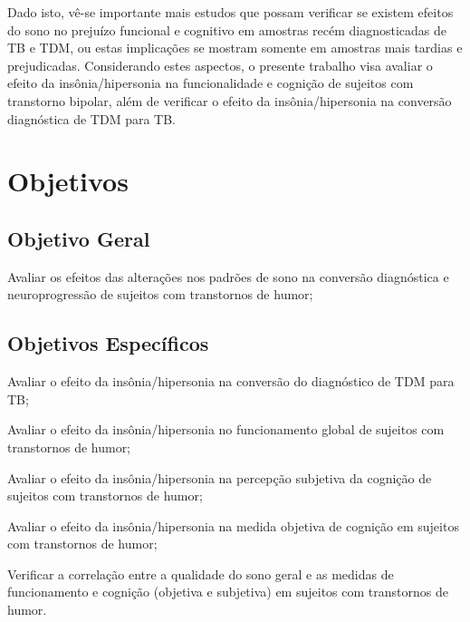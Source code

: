 \documentclass[chapter=TITLE,
               oneside,
               12pt,
               a4paper,
               english,
               brazil]{abntex2}    %
\begin{document}
    Dado isto, vê-se importante mais estudos que possam verificar se existem efeitos
    do sono no prejuízo funcional e cognitivo em amostras recém diagnosticadas
    de TB e TDM, ou estas implicações se mostram somente em amostras mais
    tardias e prejudicadas.
    Considerando estes aspectos, o presente trabalho visa avaliar o efeito da
    insônia/hipersonia na funcionalidade e cognição de sujeitos com transtorno
    bipolar, além de verificar o efeito da insônia/hipersonia na conversão
    diagnóstica de TDM para TB.

\vspace{\onelineskip}
\chapter{Objetivos}\label{sec:objetivos}

    \section{Objetivo Geral}\label{sec:geral}
    
        \begin{alineas}
    
            \item Avaliar os efeitos das alterações nos padrões de sono na
            conversão diagnóstica e neuroprogressão de sujeitos com transtornos
            de humor;

        \end{alineas}
    
    \section{Objetivos Específicos}\label{sec:especifico}
    
        \begin{alineas}[resume]
    
            \item Avaliar o efeito da insônia/hipersonia na conversão do
            diagnóstico de TDM para TB;

            \item Avaliar o efeito da insônia/hipersonia no funcionamento global
            de sujeitos com transtornos de humor;
    
            \item Avaliar o efeito da insônia/hipersonia na percepção subjetiva
            da cognição de sujeitos com transtornos de humor;

            \item Avaliar o efeito da insônia/hipersonia na medida objetiva de
            cognição em sujeitos com transtornos de humor;
    
            \item Verificar a correlação entre a qualidade do sono geral e as
            medidas de funcionamento e cognição (objetiva e subjetiva) em
            sujeitos com transtornos de humor.
    
        \end{alineas}
\end{document}
